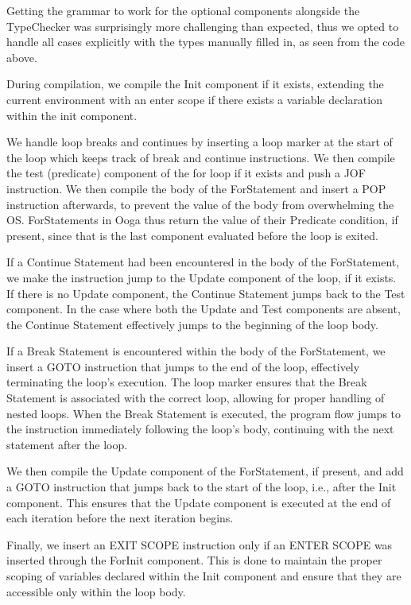 \documentclass{report}
\begin{document}
Getting the grammar to work for the optional components alongside the TypeChecker was surprisingly more challenging than expected, thus we opted to handle all cases explicitly with the types manually filled in, as seen from the code above.

During compilation, we compile the Init component if it exists, extending the current environment with an enter scope if there exists a variable declaration within the init component.

We handle loop breaks and continues by inserting a loop marker at the start of the loop which keeps track of break and continue instructions. We then compile the test (predicate) component of the for loop if it exists and push a JOF instruction. We then compile the body of the ForStatement and insert a POP instruction afterwards, to prevent the value of the body from overwhelming the OS. ForStatements in Ooga thus return the value of their Predicate condition, if present, since that is the last component evaluated before the loop is exited.

If a Continue Statement had been encountered in the body of the ForStatement, we make the instruction jump to the Update component of the loop, if it exists. If there is no Update component, the Continue Statement jumps back to the Test component. In the case where both the Update and Test components are absent, the Continue Statement effectively jumps to the beginning of the loop body.

If a Break Statement is encountered within the body of the ForStatement, we insert a GOTO instruction that jumps to the end of the loop, effectively terminating the loop's execution. The loop marker ensures that the Break Statement is associated with the correct loop, allowing for proper handling of nested loops. When the Break Statement is executed, the program flow jumps to the instruction immediately following the loop's body, continuing with the next statement after the loop.

We then compile the Update component of the ForStatement, if present, and add a GOTO instruction that jumps back to the start of the loop, i.e., after the Init component. This ensures that the Update component is executed at the end of each iteration before the next iteration begins.

Finally, we insert an EXIT SCOPE instruction only if an ENTER SCOPE was inserted through the ForInit component. This is done to maintain the proper scoping of variables declared within the Init component and ensure that they are accessible only within the loop body.
\end{document}
